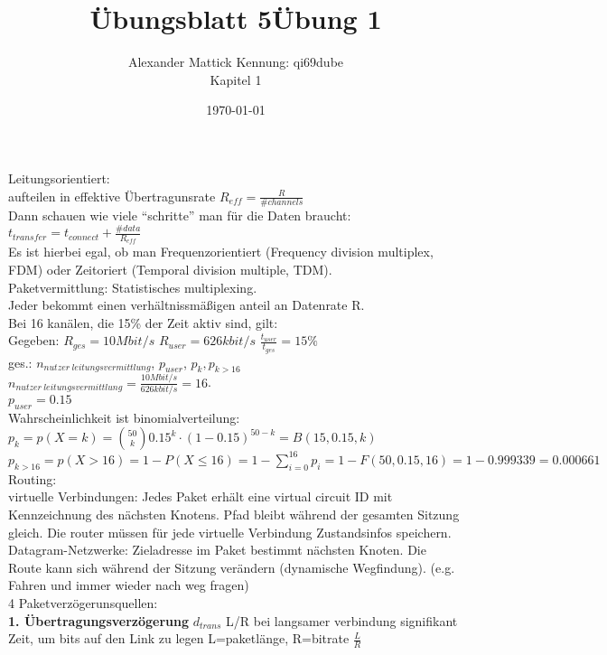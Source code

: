 \documentclass{article}
\title{Übungsblatt 5}
\author{
Alexander Mattick Kennung: qi69dube\\
Kapitel 1
}
\date{\today}
\title{Übung 1}
\begin{document}
	\maketitle
	Leitungsorientiert:\\
	aufteilen in effektive Übertragunsrate $R_{eff} = \frac{R}{\#channels}$\\
	Dann schauen wie viele ``schritte'' man für die Daten braucht:\\
	$t_{transfer} = t_{connect} + \frac{\#data}{R_{eff}}$\\
	Es ist hierbei egal, ob man Frequenzorientiert (Frequency division multiplex, FDM) oder Zeitoriert (Temporal division multiple, TDM).\\
	Paketvermittlung: Statistisches multiplexing.\\
	Jeder bekommt einen verhältnissmäßigen anteil an Datenrate R.\\
	Bei 16 kanälen, die 15\% der Zeit aktiv sind, gilt:\\
	Gegeben: $R_{ges}=10Mbit/s$ $R_{user} = 626kbit/s$ $\frac{t_{user}}{t_{ges}}=15\%$\\
	ges.: $n_{nutzer\ leitungsvermittlung}$, $p_{user}$, $p_k,p_{k>16}$\\
	$n_{nutzer\ leitungsvermittlung} = \frac{10Mbit/s}{626kbit/s} = 16$.\\
	$p_{user} = 0.15$\\
	Wahrscheinlichkeit ist binomialverteilung:\\
	$p_k=p(X=k)=\binom{50}{k} 0.15^k\cdot (1-0.15)^{50-k} = B(15,0.15,k)$\\
	$p_{k>16}=p(X>16)= 1-P(X\leq16) = 1-\sum^16_{i=0} p_i = 1-F(50,0.15,16) = 1-0.999339 = 0.000661$\\
	Routing:\\
	virtuelle Verbindungen: Jedes Paket erhält eine virtual circuit ID mit Kennzeichnung des nächsten Knotens. Pfad bleibt während der gesamten Sitzung gleich. Die router müssen für jede virtuelle Verbindung Zustandsinfos speichern.\\
	Datagram-Netzwerke: Zieladresse im Paket bestimmt nächsten Knoten. Die Route kann sich während der Sitzung verändern (dynamische Wegfindung). (e.g. Fahren und immer wieder nach weg fragen)\\
	4 Paketverzögerunsquellen:\\
	\textbf{1. Übertragungsverzögerung} $d_{trans}$ L/R bei langsamer verbindung signifikant\\
	Zeit, um bits auf den Link zu legen L=paketlänge, R=bitrate $\frac{L}{R}$\\
\end{document}
